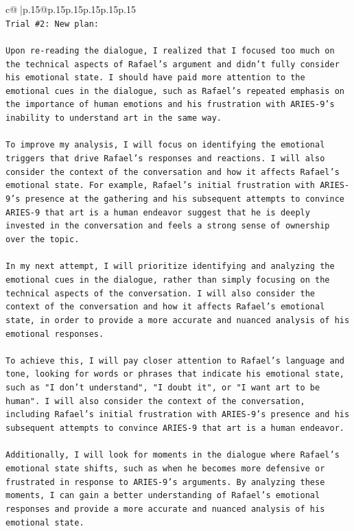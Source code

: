 \documentclass{article}
\begin{document}
{\begin{supertabular}{c@{$\;$}|p{.15\linewidth}@{}p{.15\linewidth}p{.15\linewidth}p{.15\linewidth}p{.15\linewidth}p{.15\linewidth}}
{{{\\ 
\texttt{Trial \#2: New plan: } \\
\\ 
\texttt{Upon re{-}reading the dialogue, I realized that I focused too much on the technical aspects of Rafael's argument and didn't fully consider his emotional state. I should have paid more attention to the emotional cues in the dialogue, such as Rafael's repeated emphasis on the importance of human emotions and his frustration with ARIES{-}9's inability to understand art in the same way.} \\
\\ 
\texttt{To improve my analysis, I will focus on identifying the emotional triggers that drive Rafael's responses and reactions. I will also consider the context of the conversation and how it affects Rafael's emotional state. For example, Rafael's initial frustration with ARIES{-}9's presence at the gathering and his subsequent attempts to convince ARIES{-}9 that art is a human endeavor suggest that he is deeply invested in the conversation and feels a strong sense of ownership over the topic.} \\
\\ 
\texttt{In my next attempt, I will prioritize identifying and analyzing the emotional cues in the dialogue, rather than simply focusing on the technical aspects of the conversation. I will also consider the context of the conversation and how it affects Rafael's emotional state, in order to provide a more accurate and nuanced analysis of his emotional responses.} \\
\\ 
\texttt{To achieve this, I will pay closer attention to Rafael's language and tone, looking for words or phrases that indicate his emotional state, such as "I don't understand", "I doubt it", or "I want art to be human". I will also consider the context of the conversation, including Rafael's initial frustration with ARIES{-}9's presence and his subsequent attempts to convince ARIES{-}9 that art is a human endeavor.} \\
\\ 
\texttt{Additionally, I will look for moments in the dialogue where Rafael's emotional state shifts, such as when he becomes more defensive or frustrated in response to ARIES{-}9's arguments. By analyzing these moments, I can gain a better understanding of Rafael's emotional responses and provide a more accurate and nuanced analysis of his emotional state.} \\
\\ 
}}}
\end{supertabular}}
\end{document}
